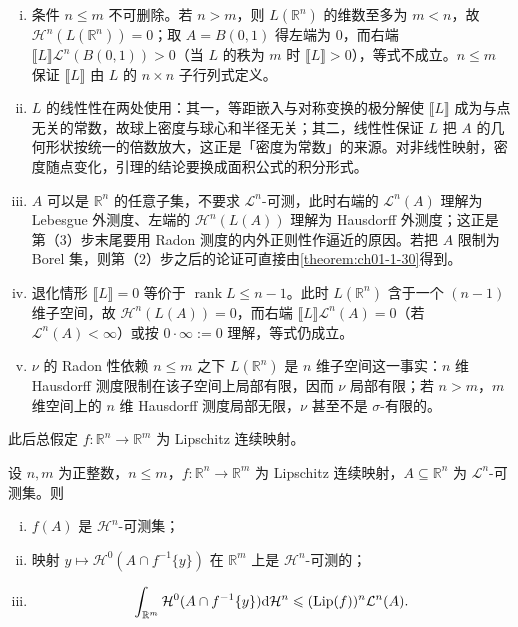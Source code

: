 \documentclass[../../main.tex]{subfiles}%
\begin{document}
\begin{remark}\label{remark:ch03-lem-3-1-条件}
\begin{enumerate}[(i)]
\item 条件 $n\leqslant m$ 不可删除。若 $n>m$，则 $L(\mathbb{R}^n)$ 的维数至多为 $m<n$，故 $\mathcal{H}^n(L(\mathbb{R}^n))=0$；取 $A=B(0,1)$ 得左端为 $0$，而右端 $\llbracket L\rrbracket\mathcal{L}^n(B(0,1))>0$（当 $L$ 的秩为 $m$ 时 $\llbracket L\rrbracket>0$），等式不成立。$n\leqslant m$ 保证 $\llbracket L\rrbracket$ 由 $L$ 的 $n\times n$ 子行列式定义。
\item $L$ 的线性性在两处使用：其一，等距嵌入与对称变换的极分解使 $\llbracket L\rrbracket$ 成为与点无关的常数，故球上密度与球心和半径无关；其二，线性性保证 $L$ 把 $A$ 的几何形状按统一的倍数放大，这正是「密度为常数」的来源。对非线性映射，密度随点变化，引理的结论要换成面积公式的积分形式。
\item $A$ 可以是 $\mathbb{R}^n$ 的任意子集，不要求 $\mathcal{L}^n$-可测，此时右端的 $\mathcal{L}^n(A)$ 理解为 Lebesgue 外测度、左端的 $\mathcal{H}^n(L(A))$ 理解为 Hausdorff 外测度；这正是第（3）步末尾要用 Radon 测度的内外正则性作逼近的原因。若把 $A$ 限制为 Borel 集，则第（2）步之后的论证可直接由\cref{theorem:ch01-1-30}得到。%
\item 退化情形 $\llbracket L\rrbracket=0$ 等价于 $\operatorname{rank}L\leqslant n-1$。此时 $L(\mathbb{R}^n)$ 含于一个 $(n-1)$ 维子空间，故 $\mathcal{H}^n(L(A))=0$，而右端 $\llbracket L\rrbracket\mathcal{L}^n(A)=0$（若 $\mathcal{L}^n(A)<\infty$）或按 $0\cdot\infty:=0$ 理解，等式仍成立。
\item $\nu$ 的 Radon 性依赖 $n\leqslant m$ 之下 $L(\mathbb{R}^n)$ 是 $n$ 维子空间这一事实：$n$ 维 Hausdorff 测度限制在该子空间上局部有限，因而 $\nu$ 局部有限；若 $n>m$，$m$ 维空间上的 $n$ 维 Hausdorff 测度局部无限，$\nu$ 甚至不是 $\sigma$-有限的。
\end{enumerate}
\end{remark}

此后总假定 $f:\mathbb{R}^n\to\mathbb{R}^m$ 为 Lipschitz 连续映射。

\begin{lemma}[像集的可测性与重数函数的可积性]\label{lemma:ch03-3-2}
设 $n,m$ 为正整数，$n\leqslant m$，$f:\mathbb{R}^n\to\mathbb{R}^m$ 为 Lipschitz 连续映射，$A\subseteq\mathbb{R}^n$ 为 $\mathcal{L}^n$-可测集。则
\begin{enumerate}[(i)]
\item $f(A)$ 是 $\mathcal{H}^n$-可测集；
\item 映射 $y\mapsto\mathcal{H}^0(A\cap f^{-1}\{y\})$ 在 $\mathbb{R}^m$ 上是 $\mathcal{H}^n$-可测的；
\item \begin{align*}
\int_{\mathbb{R}^m}\mathcal{H}^0(A\cap f^{-1}\{y\})\mathrm{d}\mathcal{H}^n\leqslant(\operatorname{Lip}(f))^n\mathcal{L}^n(A).
\end{align*}
\end{enumerate}
\end{lemma}
\end{document}
